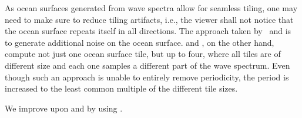 As ocean surfaces generated from wave spectra allow for seamless tiling,
one may need to make sure to reduce tiling artifacts, i.e., the viewer
shall not notice that the ocean surface repeats itself in all directions.
The approach taken by~\citet{Rydahl:2009} and \citet{NVIDIA:Ocean} is to
generate additional noise on the ocean surface.
\citet{misc:oceanlightingfft} and \citet{article:whitecaps},
on the other hand, compute not just one ocean surface tile, but up to four,
where all tiles are of different size and each one samples a different
part of the wave spectrum. Even though such an approach is unable to
entirely remove periodicity, the period is increased to the least common
multiple of the different tile sizes.

\textcolor{changed}{
We improve upon \citet{misc:oceanlightingfft} and \citet{article:whitecaps}
by using \citet{thesis:johanson}.
}